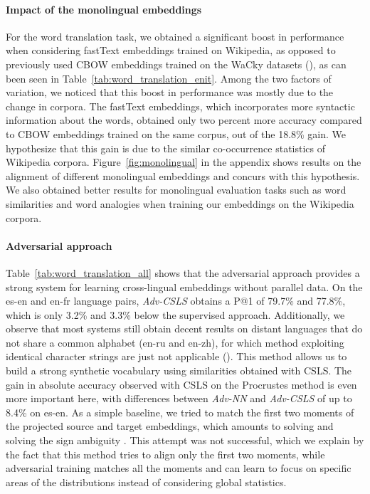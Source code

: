 \documentclass{article} \usepackage{iclr2018_conference,times}
\newcommand{\hub}{CSLS\xspace}
\begin{document}
\paragraph{Impact of the monolingual embeddings} For the word translation task, we obtained a significant boost in performance when considering fastText embeddings trained on Wikipedia, as opposed to previously used CBOW embeddings trained on the WaCky datasets (\cite{baroni2009wacky}), as can been seen in Table~\ref{tab:word_translation_enit}. Among the two factors of variation, we noticed that this boost in performance was mostly due to the change in corpora. The fastText embeddings, which incorporates more syntactic information about the words, obtained only two percent more accuracy compared to CBOW embeddings trained on the same corpus, out of the 18.8\% gain. We hypothesize that this gain is due to the similar co-occurrence statistics of Wikipedia corpora. Figure~\ref{fig:monolingual} in the appendix shows results on the alignment of different monolingual embeddings and concurs with this hypothesis. We also obtained better results for monolingual evaluation tasks such as word similarities and word analogies when training our embeddings on the Wikipedia corpora.


\paragraph{Adversarial approach} Table~\ref{tab:word_translation_all} shows that the adversarial approach provides a strong system for learning cross-lingual embeddings without parallel data. On the es-en and en-fr language pairs, \textit{Adv-\hub} obtains a P@1 of 79.7\% and 77.8\%, which is only 3.2\% and 3.3\% below the supervised approach. Additionally, we observe that most systems still obtain decent results on distant languages that do not share a common alphabet (en-ru and en-zh), for which method exploiting identical character strings are just not applicable (\cite{artetxe}). This method allows us to build a strong synthetic vocabulary using similarities obtained with \hub. The gain in absolute accuracy observed with \hub on the Procrustes method is even more important here, with differences between \textit{Adv-NN} and \textit{Adv-\hub} of up to 8.4\% on es-en.
As a simple baseline, we tried to match the first two moments of the projected source and target embeddings, which amounts to solving  and solving the sign ambiguity \citep{umeyama1988eigendecomposition}. This attempt was not successful, which we explain by the fact that this method tries to align only the first two moments, while adversarial training matches all the moments and can learn to focus on specific areas of the distributions instead of considering global statistics.
\end{document}
